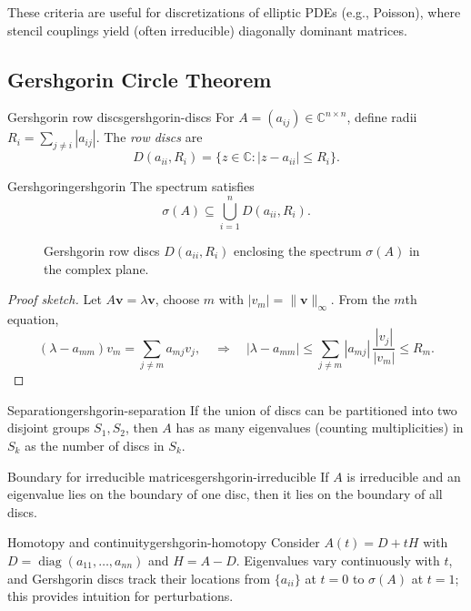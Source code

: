 These criteria are useful for discretizations of elliptic PDEs (e.g., Poisson), where stencil couplings yield (often irreducible) diagonally dominant matrices.

\subsection{Gershgorin Circle Theorem}
\begin{definition}{Gershgorin row discs}{gershgorin-discs}
    For $A=(a_{ij})\in\mathbb{C}^{n\times n}$, define radii $R_i=\sum_{j\ne i}|a_{ij}|$. The \emph{row discs} are
    \[
        D(a_{ii},R_i)=\{ z\in\mathbb{C} : |z-a_{ii}|\le R_i\}.
    \]
\end{definition}

\begin{theorem}{Gershgorin}{gershgorin}
    The spectrum satisfies
    \[
        \sigma(A)\subseteq \bigcup_{i=1}^n D(a_{ii},R_i).
    \]
\end{theorem}

\begin{figure}[H]
    \centering
    
    \caption{Gershgorin row discs $D(a_{ii},R_i)$ enclosing the spectrum $\sigma(A)$ in the complex plane.}
    \label{fig:gershgorin-discs}
\end{figure}

\begin{proof}[Proof sketch]
    Let $A\mathbf{v}=\lambda \mathbf{v}$, choose $m$ with $|v_m|=\|\mathbf{v}\|_\infty$. From the $m$th equation,
    \[
        (\lambda-a_{mm})v_m=\sum_{j\ne m} a_{mj} v_j, \quad \Rightarrow\quad |
        \lambda-a_{mm}|\le \sum_{j\ne m}|a_{mj}|\,\frac{|v_j|}{|v_m|}\le R_m.
    \]
\end{proof}

\begin{theorem}{Separation}{gershgorin-separation}
    If the union of discs can be partitioned into two disjoint groups $S_1, S_2$, then $A$ has as many eigenvalues (counting multiplicities) in $S_k$ as the number of discs in $S_k$.
\end{theorem}

\begin{theorem}{Boundary for irreducible matrices}{gershgorin-irreducible}
    If $A$ is irreducible and an eigenvalue lies on the boundary of one disc, then it lies on the boundary of all discs.
\end{theorem}

\begin{remark}{Homotopy and continuity}{gershgorin-homotopy}
    Consider $A(t)=D+tH$ with $D=\operatorname{diag}(a_{11},\dots,a_{nn})$ and $H=A-D$. Eigenvalues vary continuously with $t$, and Gershgorin discs track their locations from $\{a_{ii}\}$ at $t=0$ to $\sigma(A)$ at $t=1$; this provides intuition for perturbations.
\end{remark}

